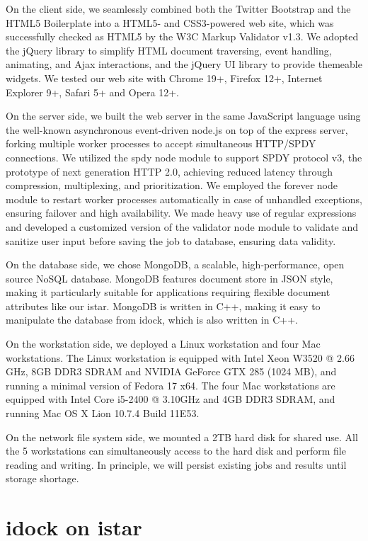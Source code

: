 \documentclass{bioinfo}
\begin{document}
On the client side, we seamlessly combined both the Twitter Bootstrap and the HTML5 Boilerplate into a HTML5- and CSS3-powered web site, which was successfully checked as HTML5 by the W3C Markup Validator v1.3. We adopted the jQuery library to simplify HTML document traversing, event handling, animating, and Ajax interactions, and the jQuery UI library to provide themeable widgets. We tested our web site with Chrome 19+, Firefox 12+, Internet Explorer 9+, Safari 5+ and Opera 12+.

On the server side, we built the web server in the same JavaScript language using the well-known asynchronous event-driven node.js on top of the express server, forking multiple worker processes to accept simultaneous HTTP/SPDY connections. We utilized the spdy node module to support SPDY protocol v3, the prototype of next generation HTTP 2.0, achieving reduced latency through compression, multiplexing, and prioritization. We employed the forever node module to restart worker processes automatically in case of unhandled exceptions, ensuring failover and high availability. We made heavy use of regular expressions and developed a customized version of the validator node module to validate and sanitize user input before saving the job to database, ensuring data validity.

On the database side, we chose MongoDB, a scalable, high-performance, open source NoSQL database. MongoDB features document store in JSON style, making it particularly suitable for applications requiring flexible document attributes like our istar. MongoDB is written in C++, making it easy to manipulate the database from idock, which is also written in C++.

On the workstation side, we deployed a Linux workstation and four Mac workstations. The Linux workstation is equipped with Intel Xeon W3520 @ 2.66 GHz, 8GB DDR3 SDRAM and NVIDIA GeForce GTX 285 (1024 MB), and running a minimal version of Fedora 17 x64. The four Mac workstations are equipped with Intel Core i5-2400 @ 3.10GHz and 4GB DDR3 SDRAM, and running Mac OS X Lion 10.7.4 Build 11E53.

On the network file system side, we mounted a 2TB hard disk for shared use. All the 5 workstations can simultaneously access to the hard disk and perform file reading and writing. In principle, we will persist existing jobs and results until storage shortage.

\section{idock on istar}
\end{document}
